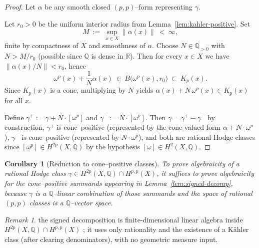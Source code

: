 \documentclass[11pt]{article}
\newcommand{\REVMZ}[1]{\textcolor{teal}{#1}}  %
\numberwithin{equation}{section}  %
\theoremstyle{plain}
\newtheorem{corollary}[theorem]{Corollary}
\theoremstyle{definition}
\theoremstyle{remark}
\newtheorem{remark}[theorem]{Remark}
\newcommand{\R}{\mathbb{R}}
\newcommand{\Q}{\mathbb{Q}}
\begin{document}
\begin{proof}
Let $\alpha$ be any smooth closed $(p,p)$--form representing $\gamma$.

Let $r_0>0$ be the uniform interior radius from Lemma~\ref{lem:kahler-positive}.
Set
\[
M\ :=\ \sup_{x\in X}\|\alpha(x)\|\ <\ \infty,
\]
finite by compactness of $X$ and smoothness of $\alpha$.
Choose $N\in\Q_{>0}$ with $N> M/r_0$ (possible since $\Q$ is dense in $\R$).
Then for every $x\in X$ we have $\|\alpha(x)/N\|<r_0$, hence
\[
\omega^p(x) + \frac{1}{N}\alpha(x)\ \in\ B\bigl(\omega^p(x),r_0\bigr)\ \subset\ K_p(x).
\]
Since $K_p(x)$ is a cone, multiplying by $N$ yields $\alpha(x)+N\,\omega^p(x)\in K_p(x)$ for all $x$.


Define $\gamma^+ := \gamma + N \cdot [\omega^p]$ and
$\gamma^- := N \cdot [\omega^p]$.
Then $\gamma = \gamma^+ - \gamma^-$ by construction,
$\gamma^+$ is cone--positive (represented by the cone-valued form
$\alpha + N \cdot \omega^p$),
$\gamma^-$ is cone--positive (represented by $N \cdot \omega^p$),
and both are rational Hodge classes since $[\omega^p]\in H^{2p}(X,\Q)$ by the hypothesis $[\omega]\in H^2(X,\Q)$.
\end{proof}
\begin{corollary}[Reduction to cone--positive classes]\label{cor:signed-decomp-usage}
To prove algebraicity of a rational Hodge class $\gamma\in H^{2p}(X,\Q)\cap H^{p,p}(X)$, it suffices to prove algebraicity for the cone--positive summands appearing in Lemma~\ref{lem:signed-decomp}, because $\gamma$ is a $\Q$--linear combination of those summands and the space of rational $(p,p)$ classes is a $\Q$--vector space.
\end{corollary}

\begin{remark}\label{rem:signed-decomp-comment}
the signed decomposition is finite-dimensional linear algebra inside $H^{2p}(X,\Q)\cap H^{p,p}(X)$ \REVMZ{\cite{Voisin02}}; it uses only rationality and the existence of a K\"ahler class (after clearing denominators), with no geometric measure input.
\end{remark}
\end{document}
